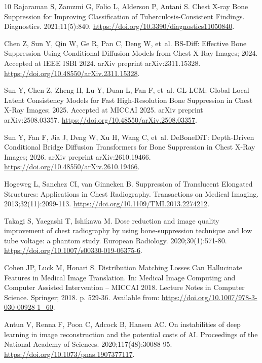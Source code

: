 \begin{thebibliography}{10}
Rajaraman S, Zamzmi G, Folio L, Alderson P, Antani S.
\newblock Chest {X}-ray Bone Suppression for Improving Classification of
  Tuberculosis-Consistent Findings.
\newblock Diagnostics. 2021;11(5):840.
\newblock \url{https://doi.org/10.3390/diagnostics11050840}.

Chen Z, Sun Y, Qin W, Ge R, Pan C, Deng W, et~al. {BS-Diff}: Effective Bone
  Suppression Using Conditional Diffusion Models from Chest {X}-Ray Images;
  2024.
\newblock Accepted at IEEE ISBI 2024.
\newblock arXiv preprint arXiv:2311.15328.
\newblock \url{https://doi.org/10.48550/arXiv.2311.15328}.

Sun Y, Chen Z, Zheng H, Lu Y, Duan L, Fan F, et~al. {GL-LCM}: Global-Local
  Latent Consistency Models for Fast High-Resolution Bone Suppression in Chest
  {X}-Ray Images; 2025.
\newblock Accepted at MICCAI 2025.
\newblock arXiv preprint arXiv:2508.03357.
\newblock \url{https://doi.org/10.48550/arXiv.2508.03357}.

Sun Y, Fan F, Jia J, Deng W, Xu H, Wang C, et~al. {DeBoneDiT}: Depth-Driven
  Conditional Bridge Diffusion Transformers for Bone Suppression in Chest
  {X}-Ray Images; 2026.
\newblock arXiv preprint arXiv:2610.19466.
\newblock \url{https://doi.org/10.48550/arXiv.2610.19466}.

Hogeweg L, Sanchez CI, van Ginneken B.
\newblock Suppression of Translucent Elongated Structures: Applications in
  Chest Radiography.
 Transactions on Medical Imaging. 2013;32(11):2099-113.
\newblock \url{https://doi.org/10.1109/TMI.2013.2274212}.

Takagi S, Yaegashi T, Ishikawa M.
\newblock Dose reduction and image quality improvement of chest radiography by
  using bone-suppression technique and low tube voltage: a phantom study.
\newblock European Radiology. 2020;30(1):571-80.
\newblock \url{https://doi.org/10.1007/s00330-019-06375-6}.

Cohen JP, Luck M, Honari S.
\newblock Distribution Matching Losses Can Hallucinate Features in Medical
  Image Translation.
\newblock In: Medical Image Computing and Computer Assisted Intervention --
  {MICCAI} 2018. Lecture Notes in Computer Science. Springer; 2018. p. 529-36.
\newblock Available from: \url{https://doi.org/10.1007/978-3-030-00928-1_60}.

Antun V, Renna F, Poon C, Adcock B, Hansen AC.
\newblock On instabilities of deep learning in image reconstruction and the
  potential costs of {AI}.
\newblock Proceedings of the National Academy of Sciences.
  2020;117(48):30088-95.
\newblock \url{https://doi.org/10.1073/pnas.1907377117}.


\end{thebibliography}
